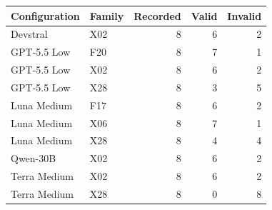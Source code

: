\begin{tabular}{llrrr}
\toprule
Configuration & Family & Recorded & Valid & Invalid\\
\midrule
Devstral & X02 & 8 & 6 & 2\\
GPT-5.5 Low & F20 & 8 & 7 & 1\\
GPT-5.5 Low & X02 & 8 & 6 & 2\\
GPT-5.5 Low & X28 & 8 & 3 & 5\\
Luna Medium & F17 & 8 & 6 & 2\\
Luna Medium & X06 & 8 & 7 & 1\\
Luna Medium & X28 & 8 & 4 & 4\\
Qwen-30B & X02 & 8 & 6 & 2\\
Terra Medium & X02 & 8 & 6 & 2\\
Terra Medium & X28 & 8 & 0 & 8\\
\bottomrule
\end{tabular}
